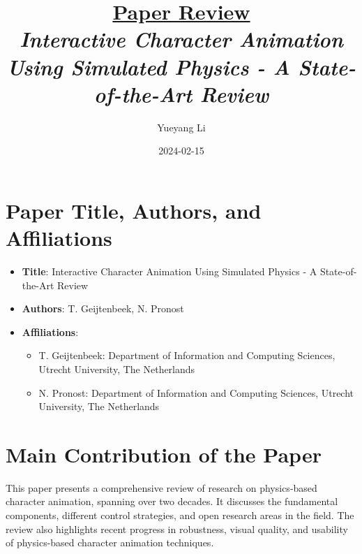 \documentclass[12pt]{article}
\newcommand{\paperTitle}{
    \textit{\normalsize{Interactive Character Animation Using Simulated Physics - A State-of-the-Art Review}}
}
\begin{document}
\title{\Large\uline{\textbf{Paper Review}} \\[0.4em]
\paperTitle{} 
}
\author{Yueyang Li}
\date{2024-02-15}

\maketitle

\section{Paper Title, Authors, and Affiliations}
\begin{itemize}[noitemsep]
    \item \textbf{Title}: Interactive Character Animation Using Simulated Physics - A State-of-the-Art Review
    \item \textbf{Authors}: T. Geijtenbeek, N. Pronost
    \item \textbf{Affiliations}:
    \begin{itemize}[noitemsep]
        \item T. Geijtenbeek: Department of Information and Computing Sciences, Utrecht University, The Netherlands
        \item N. Pronost: Department of Information and Computing Sciences, Utrecht University, The Netherlands
    \end{itemize}
\end{itemize}

\section{Main Contribution of the Paper}
This paper presents a comprehensive review of research on physics-based character animation, spanning over two decades. It discusses the fundamental components, different control strategies, and open research areas in the field. The review also highlights recent progress in robustness, visual quality, and usability of physics-based character animation techniques.
\end{document}
